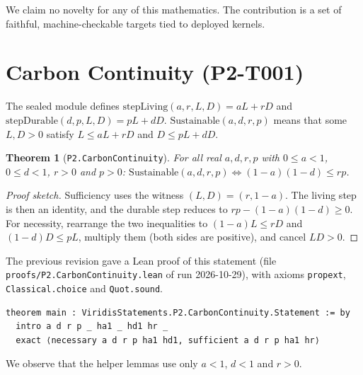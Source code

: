 \documentclass[11pt]{article}
\newtheorem{theorem}{Theorem}
\theoremstyle{definition}
\theoremstyle{remark}
\begin{document}
We claim no novelty for any of this mathematics. The contribution is a set of faithful, machine-checkable targets tied
to deployed kernels.

\section{Carbon Continuity (P2-T001)}
The sealed module defines $\mathrm{stepLiving}(a,r,L,D)=aL+rD$ and $\mathrm{stepDurable}(d,p,L,D)=pL+dD$.
$\mathrm{Sustainable}(a,d,r,p)$ means that some $L,D>0$ satisfy $L\le aL+rD$ and $D\le pL+dD$.
\begin{theorem}[\texttt{P2.CarbonContinuity}]
For all real $a,d,r,p$ with $0\le a<1$, $0\le d<1$, $r>0$ and $p>0$:
$\mathrm{Sustainable}(a,d,r,p)\iff (1-a)(1-d)\le rp$.
\end{theorem}
\begin{proof}[Proof sketch]
Sufficiency uses the witness $(L,D)=(r,1-a)$. The living step is then an identity, and the durable step reduces to
$rp-(1-a)(1-d)\ge 0$. For necessity, rearrange the two inequalities to $(1-a)L\le rD$ and $(1-d)D\le pL$,
multiply them (both sides are positive), and cancel $LD>0$.
\end{proof}
The previous revision gave a Lean proof of this statement (file \texttt{proofs/P2.CarbonContinuity.lean} of run
2026-10-29), with axioms \texttt{propext}, \texttt{Classical.choice} and \texttt{Quot.sound}.
\begin{lstlisting}
theorem main : ViridisStatements.P2.CarbonContinuity.Statement := by
  intro a d r p _ ha1 _ hd1 hr _
  exact ⟨necessary a d r p ha1 hd1, sufficient a d r p ha1 hr⟩
\end{lstlisting}
We observe that the helper lemmas use only $a<1$, $d<1$ and $r>0$.
\end{document}
